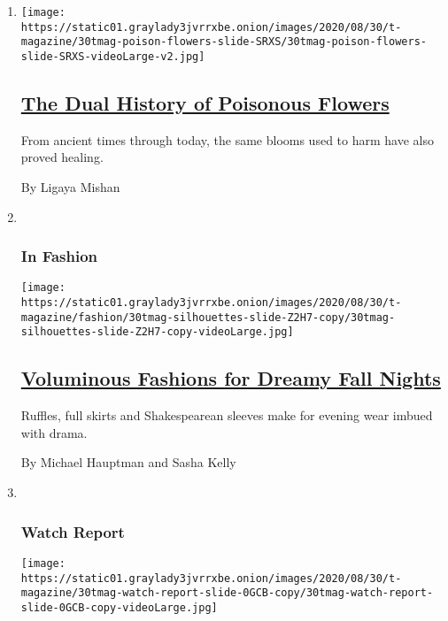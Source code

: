 \begin{enumerate}
\def\labelenumi{\arabic{enumi}.}
\item
  \texttt{[image: https://static01.graylady3jvrrxbe.onion/images/2020/08/30/t-magazine/30tmag-poison-flowers-slide-SRXS/30tmag-poison-flowers-slide-SRXS-videoLarge-v2.jpg]}

  \hypertarget{the-dual-history-of-poisonous-flowers}{%
  \subsection{\texorpdfstring{\href{/2020/08/27/t-magazine/poisonous-flowers-healing-plants.html}{The
  Dual History of Poisonous
  Flowers}}{The Dual History of Poisonous Flowers}}\label{the-dual-history-of-poisonous-flowers}}

  From ancient times through today, the same blooms used to harm have
  also proved healing.

  By Ligaya Mishan
\item ~
  \hypertarget{in-fashion}{%
  \subsubsection{In Fashion}\label{in-fashion}}

  \texttt{[image: https://static01.graylady3jvrrxbe.onion/images/2020/08/30/t-magazine/fashion/30tmag-silhouettes-slide-Z2H7-copy/30tmag-silhouettes-slide-Z2H7-copy-videoLarge.jpg]}

  \hypertarget{voluminous-fashions-for-dreamy-fall-nights}{%
  \subsection{\texorpdfstring{\href{/2020/08/27/t-magazine/fall-womens-fashion-silhouettes.html}{Voluminous
  Fashions for Dreamy Fall
  Nights}}{Voluminous Fashions for Dreamy Fall Nights}}\label{voluminous-fashions-for-dreamy-fall-nights}}

  Ruffles, full skirts and Shakespearean sleeves make for evening wear
  imbued with drama.

  By Michael Hauptman and Sasha Kelly
\item ~
  \hypertarget{watch-report}{%
  \subsubsection{Watch Report}\label{watch-report}}

  \texttt{[image: https://static01.graylady3jvrrxbe.onion/images/2020/08/30/t-magazine/30tmag-watch-report-slide-0GCB-copy/30tmag-watch-report-slide-0GCB-copy-videoLarge.jpg]}


\end{enumerate}
